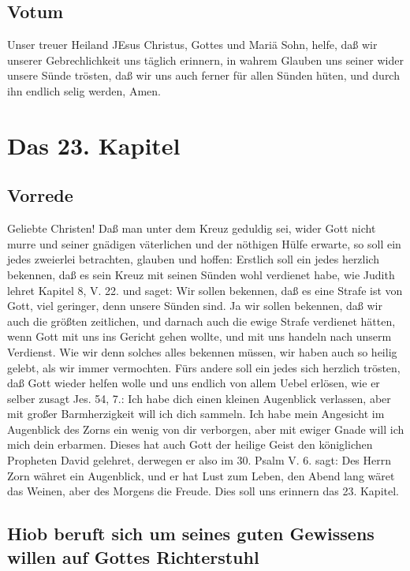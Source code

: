 \section{Votum}

Unser treuer Heiland JEsus Christus, Gottes und Mariä Sohn, helfe, daß wir unserer Gebrechlichkeit uns täglich erinnern, in wahrem Glauben uns seiner wider unsere Sünde trösten, daß wir uns auch ferner für allen Sünden hüten, und durch ihn endlich selig werden, Amen.

\chapter{Das 23. Kapitel}

\section{Vorrede}

Geliebte Christen! Daß man unter dem Kreuz geduldig sei, wider Gott nicht murre und seiner gnädigen väterlichen und der nöthigen Hülfe
erwarte, so soll ein jedes zweierlei betrachten, glauben und hoffen: Erstlich soll ein jedes herzlich bekennen, daß es sein Kreuz mit seinen Sünden wohl verdienet habe, wie Judith lehret Kapitel 8, V. 22. und saget: Wir sollen bekennen, daß es eine Strafe ist von Gott, viel geringer, denn unsere Sünden sind. Ja wir sollen bekennen, daß wir auch die größten zeitlichen, und darnach auch die ewige Strafe verdienet hätten, wenn Gott mit uns ins Gericht gehen wollte, und mit uns handeln nach unserm Verdienst. Wie wir denn solches alles bekennen müssen, wir haben auch so heilig gelebt, als wir immer vermochten. Fürs andere soll ein jedes sich herzlich trösten, daß Gott wieder helfen wolle und uns endlich von allem Uebel erlösen, wie er selber zusagt Jes. 54, 7.: Ich habe dich einen kleinen Augenblick verlassen, aber mit großer Barmherzigkeit will ich dich sammeln. Ich habe mein Angesicht im Augenblick des Zorns ein wenig von dir verborgen, aber mit ewiger Gnade will ich mich dein erbarmen. Dieses hat auch Gott der heilige Geist den königlichen Propheten David gelehret, derwegen er also im 30. Psalm V. 6. sagt: Des Herrn Zorn währet ein Augenblick, und er hat Lust zum Leben, den Abend lang wäret das Weinen, aber des Morgens die Freude. Dies soll uns erinnern das 23. Kapitel.

\section[Hiob beruft sich um seines guten Gewissens willen]{Hiob beruft sich um seines guten Gewissens willen auf Gottes Richterstuhl}

